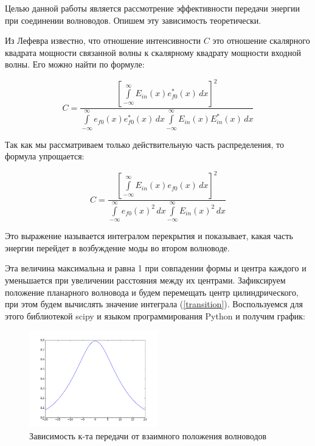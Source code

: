 Целью данной работы является рассмотрение эффективности передачи энергии при соединении волноводов. Опишем эту зависимость теоретически.

Из Лефевра известно, что отношение интенсивности $C$ это отношение скалярного квадрата мощности связанной волны к скалярному квадрату мощности входной волны. Его можно найти по формуле:

\begin{equation}
	\label{coupling_full}
	C = \frac{\left[\int\limits_{-\infty}^{\infty}E_{in}(x)e_{f0}^*(x) \,dx\right]^2}
	{\int\limits_{-\infty}^{\infty}e_{f0}(x)e_{f0}^*(x) \,dx
	 \int\limits_{-\infty}^{\infty}E_{in}(x)E_{in}^*(x) \,dx}
\end{equation}

Так как мы рассматриваем только действительную часть распределения, то формула упрощается:

\begin{equation}
	\label{coupling}
	C = \frac{\left[\int\limits_{-\infty}^{\infty}E_{in}(x)e_{f0}(x) \,dx\right]^2}
	{\int\limits_{-\infty}^{\infty}e_{f0}(x)^2 \,dx
	 \int\limits_{-\infty}^{\infty}E_{in}(x)^2 \,dx}
\end{equation}

Это выражение называется интегралом перекрытия  и показывает, какая часть энергии перейдет в возбуждение моды во втором волноводе. 

Эта величина максимальна и равна 1 при совпадении формы и центра каждого и уменьшается при увеличении расстояния между их центрами. Зафиксируем положение планарного волновода и будем перемещать центр цилиндрического, при этом будем вычислять значение интеграла (\ref{transition}). Воспользуемся для этого библиотекой scipy и языком программирования Python и получим график:
\begin{figure}[h!]
	\includegraphics[width=0.5\textwidth]{img/transition.png}
	\caption{Зависимость к-та передачи от взаимного положения волноводов}
\end{figure}

